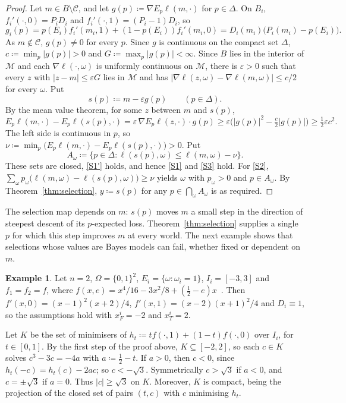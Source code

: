 \documentclass[11pt]{article}
\newenvironment{chgblockb}{\color{red}}{}
\theoremstyle{definition}
\newtheorem{example}[theorem]{Example}
\theoremstyle{remark}
\newcommand{\M}{\mathcal M}
\newcommand{\C}{\mathcal C}
\begin{document}
\begin{chgblockb}
\begin{proof}
Let $m\in B\setminus\C$, and let $g(p)\coloneqq\nabla E_p\ell(m,\cdot)$ for $p\in\Delta$. On $B_i$, $f_i'(\cdot,0)=P_iD_i$ and $f_i'(\cdot,1)=(P_i-1)D_i$, so
\[
g_i(p)=p(E_i)f_i'(m_i,1)+(1-p(E_i))f_i'(m_i,0)=D_i(m_i)\bigl(P_i(m_i)-p(E_i)\bigr).
\]
As $m\notin\C$, $g(p)\ne0$ for every $p$. Since $g$ is continuous on the compact set $\Delta$, $c\coloneqq\min_p|g(p)|>0$ and $G\coloneqq\max_p|g(p)|<\infty$. Since $B$ lies in the interior of $\M$ and each $\nabla\ell(\cdot,\omega)$ is uniformly continuous on $\M$, there is $\varepsilon>0$ such that every $z$ with $|z-m|\le\varepsilon G$ lies in $\M$ and has $|\nabla\ell(z,\omega)-\nabla\ell(m,\omega)|\le c/2$ for every $\omega$. Put
\[
s(p)\coloneqq m-\varepsilon g(p)\qquad(p\in\Delta).
\]
By the mean value theorem, for some $z$ between $m$ and $s(p)$,
\[
E_p\ell(m,\cdot)-E_p\ell(s(p),\cdot)=\varepsilon\,\nabla E_p\ell(z,\cdot)\cdot g(p)\ge\varepsilon\bigl(|g(p)|^2-\tfrac c2|g(p)|\bigr)\ge\tfrac12\varepsilon c^2.
\]
The left side is continuous in $p$, so $\nu\coloneqq\min_p\bigl(E_p\ell(m,\cdot)-E_p\ell(s(p),\cdot)\bigr)>0$. Put
\[
A_\omega\coloneqq\{p\in\Delta:\ell(s(p),\omega)\le\ell(m,\omega)-\nu\}.
\]
These sets are closed, \ref{S1'} holds, and hence \ref{S1} and \ref{S3} hold. For \ref{S2}, $\sum_\omega p_\omega\bigl(\ell(m,\omega)-\ell(s(p),\omega)\bigr)\ge\nu$ yields $\omega$ with $p_\omega>0$ and $p\in A_\omega$. By Theorem~\ref{thm:selection}, $y\coloneqq s(p)$ for any $p\in\bigcap_\omega A_\omega$ is as required.
\end{proof}

The selection map depends on $m$: $s(p)$ moves $m$ a small step in the direction of steepest descent of its $p$-expected loss. Theorem~\ref{thm:selection} supplies a single $p$ for which this step improves $m$ at every world. The next example shows that selections whose values are Bayes models can fail, whether fixed or dependent on $m$.

\begin{example}\label{ex:lindley}
Let $n=2$, $\Omega=\{0,1\}^2$, $E_i=\{\omega:\omega_i=1\}$, $I_i=[-3,3]$ and $f_1=f_2=f$, where $f(x,e)=x^4/16-3x^2/8+(\tfrac12-e)x$~\cite[Comment~2]{Lindley1982}. Then $f'(x,0)=(x-1)^2(x+2)/4$, $f'(x,1)=(x-2)(x+1)^2/4$ and $D_i\equiv1$, so the assumptions hold with $x^i_F=-2$ and $x^i_T=2$.

Let $K$ be the set of minimisers of $h_t\coloneqq tf(\cdot,1)+(1-t)f(\cdot,0)$ over $I_i$, for $t\in[0,1]$. By the first step of the proof above, $K\subseteq[-2,2]$, so each $c\in K$ solves $c^3-3c=-4a$ with $a\coloneqq\frac12-t$. If $a>0$, then $c<0$, since $h_t(-c)=h_t(c)-2ac$; so $c<-\sqrt3$. Symmetrically $c>\sqrt3$ if $a<0$, and $c=\pm\sqrt3$ if $a=0$. Thus $|c|\ge\sqrt3$ on $K$. Moreover, $K$ is compact, being the projection of the closed set of pairs $(t,c)$ with $c$ minimising $h_t$.


\end{example}
\end{chgblockb}
\end{document}
